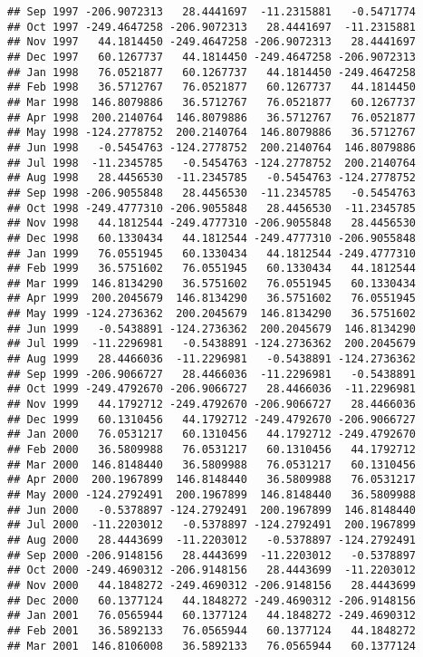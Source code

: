 \documentclass[]{article}
\begin{document}
\begin{verbatim}
## Sep 1997 -206.9072313   28.4441697  -11.2315881   -0.5471774
## Oct 1997 -249.4647258 -206.9072313   28.4441697  -11.2315881
## Nov 1997   44.1814450 -249.4647258 -206.9072313   28.4441697
## Dec 1997   60.1267737   44.1814450 -249.4647258 -206.9072313
## Jan 1998   76.0521877   60.1267737   44.1814450 -249.4647258
## Feb 1998   36.5712767   76.0521877   60.1267737   44.1814450
## Mar 1998  146.8079886   36.5712767   76.0521877   60.1267737
## Apr 1998  200.2140764  146.8079886   36.5712767   76.0521877
## May 1998 -124.2778752  200.2140764  146.8079886   36.5712767
## Jun 1998   -0.5454763 -124.2778752  200.2140764  146.8079886
## Jul 1998  -11.2345785   -0.5454763 -124.2778752  200.2140764
## Aug 1998   28.4456530  -11.2345785   -0.5454763 -124.2778752
## Sep 1998 -206.9055848   28.4456530  -11.2345785   -0.5454763
## Oct 1998 -249.4777310 -206.9055848   28.4456530  -11.2345785
## Nov 1998   44.1812544 -249.4777310 -206.9055848   28.4456530
## Dec 1998   60.1330434   44.1812544 -249.4777310 -206.9055848
## Jan 1999   76.0551945   60.1330434   44.1812544 -249.4777310
## Feb 1999   36.5751602   76.0551945   60.1330434   44.1812544
## Mar 1999  146.8134290   36.5751602   76.0551945   60.1330434
## Apr 1999  200.2045679  146.8134290   36.5751602   76.0551945
## May 1999 -124.2736362  200.2045679  146.8134290   36.5751602
## Jun 1999   -0.5438891 -124.2736362  200.2045679  146.8134290
## Jul 1999  -11.2296981   -0.5438891 -124.2736362  200.2045679
## Aug 1999   28.4466036  -11.2296981   -0.5438891 -124.2736362
## Sep 1999 -206.9066727   28.4466036  -11.2296981   -0.5438891
## Oct 1999 -249.4792670 -206.9066727   28.4466036  -11.2296981
## Nov 1999   44.1792712 -249.4792670 -206.9066727   28.4466036
## Dec 1999   60.1310456   44.1792712 -249.4792670 -206.9066727
## Jan 2000   76.0531217   60.1310456   44.1792712 -249.4792670
## Feb 2000   36.5809988   76.0531217   60.1310456   44.1792712
## Mar 2000  146.8148440   36.5809988   76.0531217   60.1310456
## Apr 2000  200.1967899  146.8148440   36.5809988   76.0531217
## May 2000 -124.2792491  200.1967899  146.8148440   36.5809988
## Jun 2000   -0.5378897 -124.2792491  200.1967899  146.8148440
## Jul 2000  -11.2203012   -0.5378897 -124.2792491  200.1967899
## Aug 2000   28.4443699  -11.2203012   -0.5378897 -124.2792491
## Sep 2000 -206.9148156   28.4443699  -11.2203012   -0.5378897
## Oct 2000 -249.4690312 -206.9148156   28.4443699  -11.2203012
## Nov 2000   44.1848272 -249.4690312 -206.9148156   28.4443699
## Dec 2000   60.1377124   44.1848272 -249.4690312 -206.9148156
## Jan 2001   76.0565944   60.1377124   44.1848272 -249.4690312
## Feb 2001   36.5892133   76.0565944   60.1377124   44.1848272
## Mar 2001  146.8106008   36.5892133   76.0565944   60.1377124
\end{verbatim}
\end{document}

